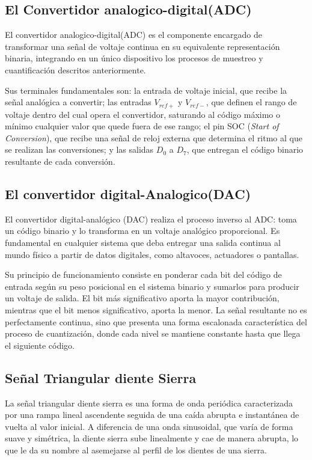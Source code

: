 \documentclass[12pt,letterpaper]{article}
\begin{document}
    \subsection{El Convertidor analogico-digital(ADC)}
    El convertidor analogico-digital(ADC) es el componente encargado de transformar una señal de voltaje continua en su equivalente representación binaria, integrando en un único dispositivo los procesos de muestreo y cuantificación descritos anteriormente.

    Sus terminales fundamentales son: la entrada de voltaje inicial, que recibe la señal analógica a convertir; las entradas $V_{ref+}$ y $V_{ref-}$, que definen el rango de voltaje dentro del cual opera el convertidor, saturando al código máximo o mínimo cualquier valor que quede fuera de ese rango; el pin SOC (\textit{Start of Conversion}), que recibe una señal de reloj externa que determina el ritmo al que se realizan las conversiones; y las salidas $D_0$ a $D_7$, que entregan el código binario resultante de cada conversión.
 
    \subsection{El convertidor digital-Analogico(DAC)}
    El convertidor digital-analógico (DAC) realiza el proceso inverso al ADC: toma un código binario y lo transforma en un voltaje analógico proporcional. Es fundamental en cualquier sistema que deba entregar una salida continua al mundo físico a partir de datos digitales, como altavoces, actuadores o pantallas.

    Su principio de funcionamiento consiste en ponderar cada bit del código de entrada según su peso posicional en el sistema binario y sumarlos para producir un voltaje de salida. El bit más significativo  aporta la mayor contribución, mientras que el bit menos significativo, aporta la menor. La señal resultante no es perfectamente continua, sino que presenta una forma escalonada característica del proceso de cuantización, donde cada nivel se mantiene constante hasta que llega el siguiente código.

    \subsection{Señal Triangular diente Sierra}
    La señal triangular diente sierra es una forma de onda periódica caracterizada por una rampa lineal ascendente seguida de una caída abrupta e instantánea de vuelta al valor inicial. A diferencia de una onda sinusoidal, que varía de forma suave y simétrica, la diente sierra sube linealmente y cae de manera abrupta, lo que le da su nombre al asemejarse al perfil de los dientes de una sierra.
\end{document}
